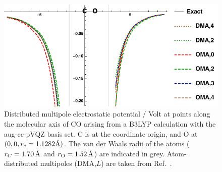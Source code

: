 \documentclass[journal=jacsat,manuscript=article]{achemso}
\begin{document}
\begin{figure}
    \centering
    \includegraphics{fig1.pdf}
    \caption{Distributed multipole electrostatic potential / Volt at points along the molecular axis of CO arising from a B3LYP calculation with the aug-cc-pVQZ basis set\cite{Kendall1992a}. C is at the coordinate origin, and O at $(0,0,r_e=1.1282\text\AA)$.
    The van der Waals radii of the atoms\cite{Bondi1964VanRadii} ($r_C=1.70\,\text\AA$ and $r_{\text O}=1.52\,\text\AA$) are indicated in grey.
    Atom-distributed multipoles (DMA,$L$) are taken from Ref.~.
    }
\label{fig:1}
\end{figure}
\end{document}
